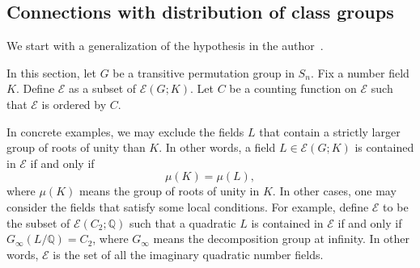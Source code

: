 \documentclass{amsart}
\numberwithin{equation}{section}
\theoremstyle{plain}
\theoremstyle{definition}
\theoremstyle{remark}
\begin{document}
\subsection{Connections with distribution of class groups}
We start with a generalization of the hypothesis in the author~\cite{wang2022distributionOT}.

In this section, let $G$ be a transitive permutation group in $S_n$.
Fix a number field $K$.
Define $\mathcal{E}$ as a subset of $\mathcal{E}(G;K)$.
Let $C$ be a counting function on $\mathcal{E}$ such that $\mathcal{E}$ is ordered by $C$.

In concrete examples, we may exclude the fields $L$ that contain a strictly larger group of roots of unity than $K$.
In other words, a field $L\in\mathcal{E}(G;K)$ is contained in $\mathcal{E}$ if and only if
\begin{equation*}
	\mu(K)=\mu(L),
\end{equation*}
where $\mu(K)$ means the group of roots of unity in $K$.
In other cases, one may consider the fields that satisfy some local conditions.
For example, define $\mathcal{E}$ to be the subset of $\mathcal{E}(C_2;\mathbb{Q})$ such that a quadratic $L$ is contained in $\mathcal{E}$ if and only if $G_{\infty}(L/\mathbb{Q})=C_2$, where $G_{\infty}$ means the decomposition group at infinity.
In other words, $\mathcal{E}$ is the set of all the imaginary quadratic number fields.
\end{document}
